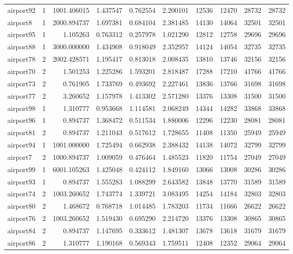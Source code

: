 \begin{longtable}{|l|r|r|r|r|r|r|r|r|r|}
airport92 & 1 & 1001.406015 & 1.437547 & 0.762554 & 2.200101 & 12536 & 12470 & 28732 & 28732 \\
airport8 & 1 & 2000.894737 & 1.697381 & 0.684104 & 2.381485 & 14130 & 14064 & 32501 & 32501 \\
airport95 & 1 & 1.105263 & 0.763312 & 0.257978 & 1.021290 & 12812 & 12758 & 29696 & 29696 \\
airport88 & 1 & 3000.000000 & 1.434908 & 0.918049 & 2.352957 & 14124 & 14054 & 32735 & 32735 \\
airport78 & 2 & 2002.428571 & 1.195417 & 0.813018 & 2.008435 & 13810 & 13746 & 32156 & 32156 \\
airport70 & 2 & 1.501253 & 1.225286 & 1.593201 & 2.818487 & 17288 & 17210 & 41766 & 41766 \\
airport73 & 2 & 0.761905 & 1.733769 & 0.493692 & 2.227461 & 13836 & 13766 & 31698 & 31698 \\
airport77 & 2 & 3.260652 & 1.157978 & 1.413302 & 2.571280 & 13376 & 13308 & 31500 & 31500 \\
airport98 & 1 & 1.310777 & 0.953668 & 1.114581 & 2.068249 & 14344 & 14282 & 33868 & 33868 \\
airport96 & 1 & 0.894737 & 1.368472 & 0.511534 & 1.880006 & 12296 & 12230 & 28081 & 28081 \\
airport81 & 2 & 0.894737 & 1.211043 & 0.517612 & 1.728655 & 11408 & 11350 & 25949 & 25949 \\
airport94 & 1 & 1001.000000 & 1.725494 & 0.662938 & 2.388432 & 14138 & 14072 & 32799 & 32799 \\
airport7 & 2 & 1000.894737 & 1.009059 & 0.476464 & 1.485523 & 11820 & 11754 & 27049 & 27049 \\
airport99 & 1 & 6001.105263 & 1.425048 & 0.424112 & 1.849160 & 13066 & 13008 & 30286 & 30286 \\
airport93 & 1 & 0.894737 & 1.555283 & 1.088299 & 2.643582 & 13848 & 13770 & 31589 & 31589 \\
airport74 & 2 & 1003.260652 & 1.743774 & 1.339721 & 3.083495 & 14254 & 14184 & 32803 & 32803 \\
airport80 & 2 & 1.468672 & 0.768718 & 1.014485 & 1.783203 & 11734 & 11666 & 26622 & 26622 \\
airport76 & 2 & 1003.260652 & 1.519430 & 0.695290 & 2.214720 & 13376 & 13308 & 30865 & 30865 \\
airport84 & 2 & 0.894737 & 1.147695 & 0.333612 & 1.481307 & 13678 & 13618 & 31679 & 31679 \\
airport86 & 2 & 1.310777 & 1.190168 & 0.569343 & 1.759511 & 12408 & 12352 & 29064 & 29064 \\

\end{longtable}

